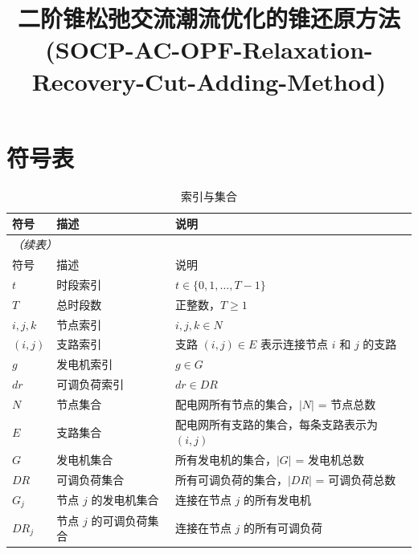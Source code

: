 \documentclass[12pt,a4paper]{article}
\title{二阶锥松弛交流潮流优化的锥还原方法\\(SOCP-AC-OPF-Relaxation-Recovery-Cut-Adding-Method)}
\author{}
\date{}
\begin{document}
\maketitle

\tableofcontents
\newpage

\section{符号表}

\begin{longtable}{p{3cm}p{5cm}p{6cm}}
\caption{索引与集合}\label{tab:indices} \\
\toprule
符号 & 描述 & 说明 \\
\midrule
\endfirsthead
\multicolumn{3}{l}{\small\itshape（续表）} \\
\toprule
符号 & 描述 & 说明 \\
\midrule
\endhead
\bottomrule
\endlastfoot
$t$ & 时段索引 & $t \in \{0, 1, \ldots, T-1\}$ \\
$T$ & 总时段数 & 正整数，$T \geq 1$ \\
$i, j, k$ & 节点索引 & $i, j, k \in N$ \\
$(i, j)$ & 支路索引 & 支路 $(i,j) \in E$ 表示连接节点 $i$ 和 $j$ 的支路 \\
$g$ & 发电机索引 & $g \in G$ \\
$dr$ & 可调负荷索引 & $dr \in DR$ \\
$N$ & 节点集合 & 配电网所有节点的集合，$|N|$ = 节点总数 \\
$E$ & 支路集合 & 配电网所有支路的集合，每条支路表示为 $(i, j)$ \\
$G$ & 发电机集合 & 所有发电机的集合，$|G|$ = 发电机总数 \\
$DR$ & 可调负荷集合 & 所有可调负荷的集合，$|DR|$ = 可调负荷总数 \\
$G_j$ & 节点 $j$ 的发电机集合 & 连接在节点 $j$ 的所有发电机 \\
$DR_j$ & 节点 $j$ 的可调负荷集合 & 连接在节点 $j$ 的所有可调负荷 \\
\end{longtable}
\end{document}
